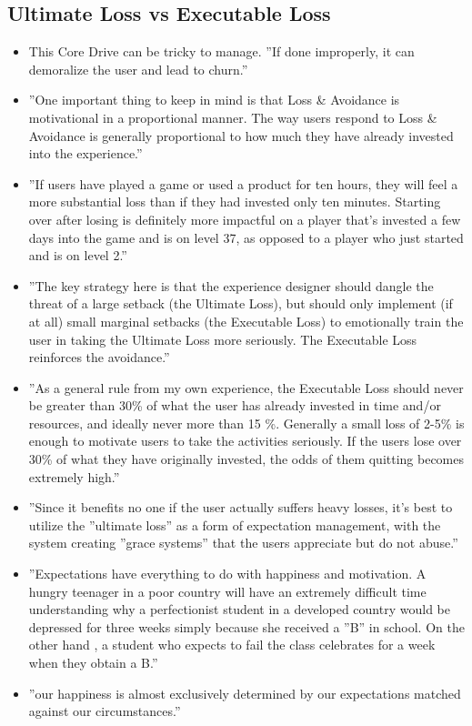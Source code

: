 \subsection{Ultimate Loss vs Executable Loss}
    \begin{itemize}
        \item This Core Drive can be tricky to manage. ''If done improperly, it can demoralize the user and lead to churn.''
        \item ''One important thing to keep in mind is that Loss \& Avoidance is motivational in a proportional manner. The way users respond to Loss \& Avoidance is generally proportional to how much they have already invested into the experience.''
        \item ''If users have played a game or used a product for ten hours, they will feel a more substantial loss than if they had invested only ten minutes. Starting over after losing is definitely more impactful on a player that's invested a few days into the game and is on level 37, as opposed to a player who just started and is on level 2.''
        \item ''The key strategy here is that the experience designer should dangle the threat of a large setback (the Ultimate Loss), but should only implement (if at all) small marginal setbacks (the Executable Loss) to emotionally train the user in taking the Ultimate Loss more seriously. The Executable Loss reinforces the avoidance.''
        \item ''As a general rule from my own experience, the Executable Loss should never be greater than 30\% of what the user has already invested in time and/or resources, and ideally never more than 15 \%. Generally a small loss of 2-5\% is enough to motivate users to take the activities seriously. If the users lose over 30\% of what they have originally invested, the odds of them quitting becomes extremely high.''
        \item ''Since it benefits no one if the user actually suffers heavy losses, it's best to utilize the ''ultimate loss'' as a form of expectation management, with the system creating ''grace systems'' that the users appreciate but do not abuse.''
        \item ''Expectations have everything to do with happiness and motivation. A hungry teenager in a poor country will have an extremely difficult time understanding why a perfectionist student in a developed country would be depressed for three weeks simply because she received a ''B'' in school. On the other hand , a student who expects to fail the class celebrates for a week when they obtain a B.''
        \item ''our happiness is almost exclusively determined by our expectations matched against our circumstances.''
    \end{itemize}
    
